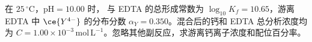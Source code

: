 在 $25\,^{\circ}\mathrm{C}$，$\mathrm{pH}=10.00$ 时， 与 EDTA 的总形成常数为 $\log_{10}K_f=10.65$，游离 EDTA 中 $\ce{Y^{4-}}$ 的分布分数 $\alpha_Y=0.350$。混合后的钙和 EDTA 总分析浓度均为 $C=1.00\times10^{-3}\,\mathrm{mol\,L^{-1}}$。忽略其他副反应，求游离钙离子浓度和配位百分率。
